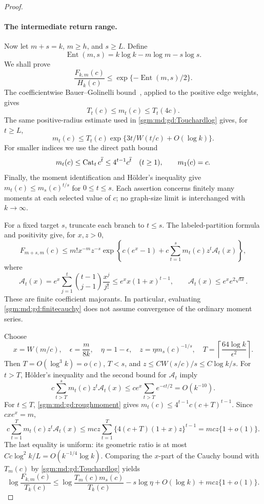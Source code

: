 \documentclass[11pt,letterpaper]{article}
\theoremstyle{remark}\newtheorem{remark}[theorem]{Remark}
\newcommand{\Cat}{\operatorname{Cat}}\newcommand{\E}{\mathbb E}\newcommand{\Prob}{\mathbb P}\newcommand{\ind}{\mathbf 1}
\theoremstyle{definition}\newtheorem{definition}[theorem]{Definition}
\begin{document}
\begin{proof}
\paragraph{The intermediate return range.}
Now let $m+s=k$, $m\ge h$, and $s\ge L$.  Define
\[
 \operatorname{Ent}(m,s)=k\log k-m\log m-s\log s.
\]
We shall prove
\begin{equation}\label{sgm:md:gd:intermediate}
 \frac{F_{k,m}(c)}{H_k(c)}
 \le\exp\{-\operatorname{Ent}(m,s)/2\}.
\end{equation}
The coefficientwise Bauer--Golinelli bound~\cite{bg}, applied to the positive
edge weights, gives
\[
 T_t(c)\le m_t(c)\le T_t(4c).
\]
The same positive-radius estimate used in
\eqref{sgm:md:gd:Touchardlog} gives, for $t\ge L$,
\begin{equation}\label{sgm:md:gd:envelope}
 m_t(c)\le T_t(c)
 \exp\{3t/W(t/c)+O(\log k)\}.
\end{equation}
For smaller indices we use the direct path bound
\begin{equation}\label{sgm:md:gd:roughmoment}
 m_t(c)\le\Cat_t\rise{c}{t}\le4^{t-1}\rise{c}{t}
 \quad(t\ge1),\qquad m_1(c)=c.
\end{equation}
Finally, the moment identification and H\"older's inequality give
$m_t(c)\le m_s(c)^{t/s}$ for $0\le t\le s$.
Each assertion concerns finitely many moments at each selected value
of $c$; no graph-size limit is interchanged with $k\to\infty$.

For a fixed target $s$, truncate each branch to $t\le s$.
The labeled-partition formula and positivity give, for $x,z>0$,
\begin{equation}\label{sgm:md:gd:finitecauchy}
 F_{m+s,m}(c)
 \le m!x^{-m}z^{-s}
 \exp\!\left\{c(e^x-1)
       +c\sum_{t=1}^s m_t(c)z^t\mathcal A_t(x)\right\},
\end{equation}
where
\[
 \mathcal A_t(x)
 =e^x\sum_{j=1}^t\binom{t-1}{j-1}\frac{x^j}{j!}
 \le e^xx(1+x)^{t-1},\qquad
 \mathcal A_t(x)\le e^x e^{2\sqrt{tx}}.
\]
These are finite coefficient majorants.  In particular, evaluating
\eqref{sgm:md:gd:finitecauchy} does not assume convergence of the ordinary
moment series.

Choose
\[
 x=W(m/c),\quad \epsilon=\frac{m}{8k},\quad \eta=1-\epsilon,
 \quad z=\eta m_s(c)^{-1/s},\quad
 T=\left\lceil\frac{64\log k}{\epsilon^2}\right\rceil.
\]
Then $T=O(\log^3k)=o(c)$, $T<s$, and
$z\le C W(s/c)/s\le C\log k/s$.
For $t>T$, H\"older's inequality and the second bound for
$\mathcal A_t$ imply
\[
 c\sum_{t>T}^s m_t(c)z^t\mathcal A_t(x)
 \le ce^x\sum_{t>T}e^{-\epsilon t/2}=O(k^{-10}).
\]
For $t\le T$, \eqref{sgm:md:gd:roughmoment} gives
$m_t(c)\le4^{t-1}c(c+T)^{t-1}$.  Since $cxe^x=m$,
\[
 c\sum_{t=1}^T m_t(c)z^t\mathcal A_t(x)
 \le mc z\sum_{t=1}^T
       \{4(c+T)(1+x)z\}^{t-1}
 =mc z\{1+o(1)\}.
\]
The last equality is uniform: its geometric ratio is at most
$C c\log^2 k/L=O(k^{-1/4}\log k)$.
Comparing the $x$-part of the Cauchy bound with $T_m(c)$ by
\eqref{sgm:md:gd:Touchardlog} yields
\begin{equation}\label{sgm:md:gd:masterentropy}
 \log\frac{F_{k,m}(c)}{T_k(c)}
 \le\log\frac{T_m(c)m_s(c)}{T_k(c)}
    -s\log\eta+O(\log k)+mc z\{1+o(1)\}.
\end{equation}


\end{proof}
\end{document}
